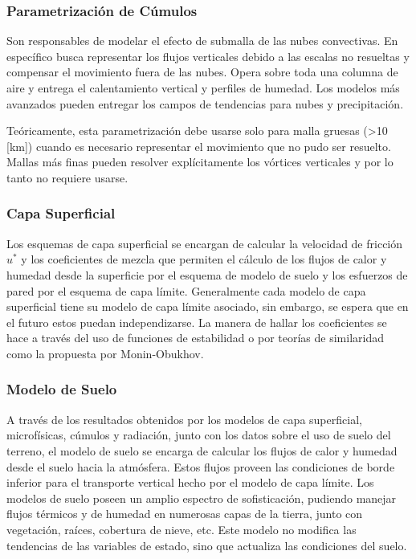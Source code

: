 \subsubsection{Parametrización de Cúmulos}
Son responsables de modelar el efecto de submalla de las nubes convectivas. En específico busca representar los flujos verticales debido a las escalas no resueltas y compensar el movimiento fuera de las nubes. Opera sobre toda una columna de aire y entrega el calentamiento vertical y perfiles de humedad. Los modelos más avanzados pueden entregar los campos de tendencias para nubes y precipitación.

Teóricamente, esta parametrización debe usarse solo para malla gruesas (>10 [km]) cuando es necesario representar el movimiento que no pudo ser resuelto. Mallas más finas pueden resolver explícitamente los vórtices verticales y por lo tanto no requiere usarse.
\subsubsection{Capa Superficial}
Los esquemas de capa superficial se encargan de calcular la velocidad de fricción $u^*$ y los coeficientes de mezcla que permiten el cálculo de los flujos de calor y humedad desde la superficie por el esquema de modelo de suelo y los esfuerzos de pared por el esquema de capa límite. Generalmente cada modelo de capa superficial tiene su modelo de capa límite asociado, sin embargo, se espera que en el futuro estos puedan independizarse. La manera de hallar los coeficientes se hace a través del uso de funciones de estabilidad o por teorías de similaridad como la propuesta por Monin-Obukhov.
\subsubsection{Modelo de Suelo}
A través de los resultados obtenidos por los modelos de capa superficial, microfísicas, cúmulos y radiación, junto con los datos sobre el uso de suelo del terreno, el modelo de suelo se encarga de calcular los flujos de calor y humedad desde el suelo hacia la atmósfera. Estos flujos proveen las condiciones de borde inferior para el transporte vertical hecho por el modelo de capa límite. Los modelos de suelo poseen un amplio espectro de sofisticación, pudiendo manejar flujos térmicos y de humedad en numerosas capas de la tierra, junto con vegetación, raíces, cobertura de nieve, etc. Este modelo no modifica las tendencias de las variables de estado, sino que actualiza las condiciones del suelo.
